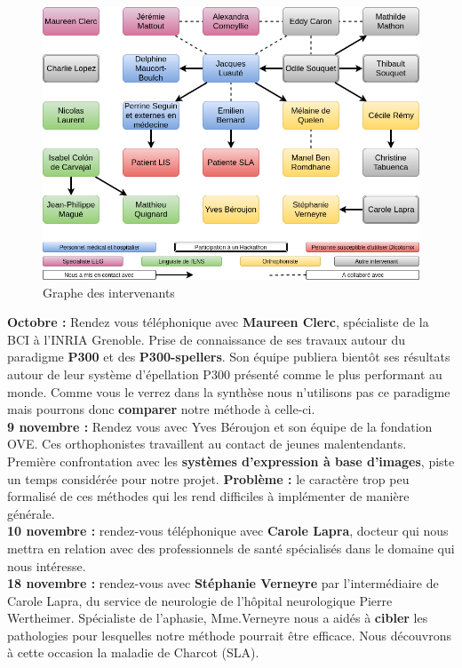 \documentclass[11pt,a4paper]{article}
\theoremstyle{plain}
\theoremstyle{definition}
\begin{document}
\begin{figure}[h!]
\centering \includegraphics[width=16.6cm]{images/grapheIntervenants.png}
\caption{Graphe des intervenants}
\label{grapheIntervenants}
\end{figure}
\vspace{1cm}
\textbf{Octobre : } Rendez vous téléphonique avec \textbf{Maureen Clerc}, spécialiste de la BCI à l'INRIA Grenoble. Prise de connaissance de ses travaux autour du paradigme \textbf{P300} et des \textbf{P300-spellers}. Son équipe publiera bientôt ses résultats autour de leur système d'épellation P300 présenté comme le plus performant au monde. Comme vous le verrez dans la synthèse nous n'utilisons pas ce paradigme mais pourrons donc \textbf{comparer} notre méthode à celle-ci.\\

\textbf{9 novembre : } Rendez vous avec Yves Béroujon et son équipe de la fondation OVE. Ces orthophonistes travaillent au contact de jeunes malentendants. Première confrontation avec les \textbf{systèmes d'expression à base d'images}, piste un temps considérée pour notre projet.  \textbf{Problème :} le caractère trop peu formalisé de ces méthodes qui les rend difficiles à implémenter de manière générale. \\

\textbf{10 novembre : } rendez-vous téléphonique avec \textbf{Carole Lapra}, docteur qui nous mettra en relation avec des professionnels de santé spécialisés dans le domaine qui nous intéresse. \\

\textbf{18 novembre : } rendez-vous avec \textbf{Stéphanie Verneyre} par l'intermédiaire de Carole Lapra, du service de neurologie de l'hôpital neurologique Pierre Wertheimer. Spécialiste de l'aphasie, Mme.Verneyre nous a aidés à \textbf{cibler} les pathologies pour lesquelles notre méthode pourrait être efficace. Nous découvrons à cette occasion la maladie de Charcot (SLA). \\
\end{document}
